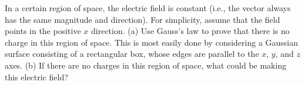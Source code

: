 In a certain region of space, the electric field is constant (i.e.,
the vector always has the same magnitude and direction).
For simplicity, assume that the field points in the positive $x$
direction. (a) Use Gauss's law to prove that there is no charge
in this region of space. This is most easily done by considering
a Gaussian surface consisting of a rectangular box, whose edges
are parallel to the $x$, $y$, and $z$ axes.\hwendpart
 (b) If there are
no charges in this region of space, what could be making this
electric field?
